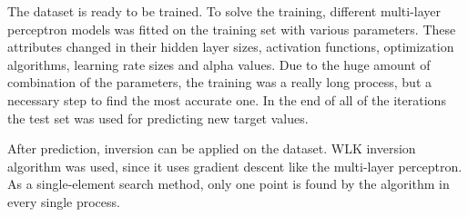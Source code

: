The dataset is ready to be trained. To solve the training, different multi-layer perceptron models was fitted on the training set with various parameters. These attributes changed in their hidden layer sizes, activation functions, optimization algorithms, learning rate sizes and alpha values. Due to the huge amount of combination of the parameters, the training was a really long process, but a necessary step to find the most accurate one. In the end of all of the iterations the test set was used for predicting new target values. \smallskip

After prediction, inversion can be applied on the dataset. WLK inversion algorithm was used, since it uses gradient descent like the multi-layer perceptron. As a single-element search method, only one point is found by the algorithm in every single process. 

